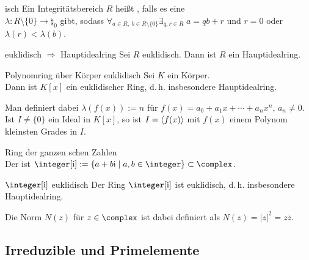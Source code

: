 \linie

\begin{Def}{isch}
    Ein Integritätsbereich $R$ heißt , falls
    es eine \\
    $\lambda\colon R \setminus \{0\} \rightarrow \natural_0$ gibt, sodass
    $\forall_{a \in R,\; b \in R \setminus \{0\}} \exists_{q, r \in R}\;
    a = qb + r$ und $r = 0$ oder $\lambda(r) < \lambda(b)$.
\end{Def}

\begin{Theorem}{euklidisch $\Rightarrow$ Hauptidealring}
    Sei $R$ euklidisch.
    Dann ist $R$ ein Hauptidealring.
\end{Theorem}

\linie

\begin{Prop}{Polynomring über Körper euklidisch}
    Sei $K$ ein Körper.\\
    Dann ist $K[x]$ ein euklidischer Ring, d.\,h. insbesondere Hauptidealring.
\end{Prop}

\begin{Bem}
    Man definiert dabei $\lambda(f(x)) := n$
    für $f(x) = a_0 + a_1 x + \dotsb + a_n x^n$, $a_n \not= 0$.
    Ist $I \not= \{0\}$ ein Ideal in $K[x]$, so ist
    $I = \left\langle f(x)\right\rangle$ mit $f(x)$ einem Polynom kleinsten Grades in $I$.
\end{Bem}

\begin{Def}{Ring der ganzen schen Zahlen}\\
    Der  ist
    $\integer[\i] := \{a + b\i \;|\; a, b \in \integer\} \subset \complex$.
\end{Def}

\begin{Prop}{$\integer[\i]$ euklidisch}
    Der Ring $\integer[\i]$ ist euklidisch, d.\,h. insbesondere Hauptidealring.
\end{Prop}

\begin{Bem}
    Die Norm $N(z)$ für $z \in \complex$ ist dabei definiert als
    $N(z) = |z|^2 = z \overline{z}$.
\end{Bem}

\subsection{%
    Irreduzible und Primelemente%
}

